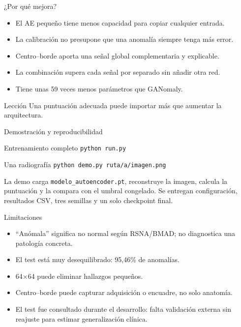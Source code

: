 \documentclass[aspectratio=169,10pt]{beamer}
\begin{document}
\begin{frame}{¿Por qué mejora?}
  \begin{itemize}
    \item El AE pequeño tiene menos capacidad para copiar cualquier entrada.
    \item La calibración no presupone que una anomalía siempre tenga más error.
    \item Centro--borde aporta una señal global complementaria y explicable.
    \item La combinación supera cada señal por separado sin añadir otra red.
    \item Tiene unas 59 veces menos parámetros que GANomaly.
  \end{itemize}
  \begin{alertblock}{Lección}
    Una puntuación adecuada puede importar más que aumentar la arquitectura.
  \end{alertblock}
\end{frame}

\begin{frame}{Demostración y reproducibilidad}
  \begin{block}{Entrenamiento completo}
    \texttt{python run.py}
  \end{block}
  \begin{block}{Una radiografía}
    \texttt{python demo.py ruta/a/imagen.png}
  \end{block}
  La demo carga \texttt{modelo\_autoencoder.pt}, reconstruye la imagen, calcula
  la puntuación y la compara con el umbral congelado. Se entregan configuración,
  resultados CSV, tres semillas y un solo checkpoint final.
\end{frame}

\begin{frame}{Limitaciones}
  \begin{itemize}
    \item ``Anómala'' significa no normal según RSNA/BMAD; no diagnostica una
    patología concreta.
    \item El test está muy desequilibrado: 95,46\% de anomalías.
    \item 64$\times$64 puede eliminar hallazgos pequeños.
    \item Centro--borde puede capturar adquisición o encuadre, no solo anatomía.
    \item El test fue consultado durante el desarrollo: falta validación externa
    sin reajuste para estimar generalización clínica.
  \end{itemize}
\end{frame}
\end{document}
